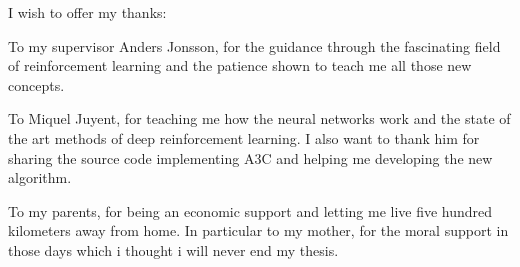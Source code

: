 
I wish to offer my thanks:

To my supervisor Anders Jonsson, for the guidance through the fascinating field of reinforcement learning and the
patience shown to teach me all those new concepts.

To Miquel Juyent, for teaching me how the neural networks work and the state of the art methods of deep reinforcement learning.
I also want to thank him for sharing the source code implementing \acl{A3C} and helping me developing the new algorithm.

To my parents, for being an economic support and letting me live five hundred kilometers away from home.
In particular to my mother, for the moral support in those days which i thought i will never end my thesis.